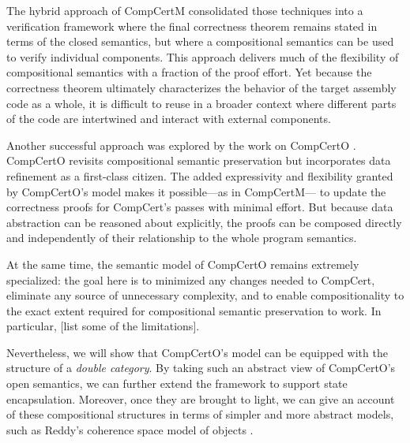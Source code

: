 \documentclass[acmsmall,screen,review,anonymous]{acmart}
\begin{document}
The hybrid approach of CompCertM
\cite{compcertm}
consolidated those techniques
into a verification framework
where the final correctness theorem
remains stated in terms of the closed semantics,
but where a compositional semantics
can be used to verify individual components.
This approach delivers much of the flexibility
of compositional semantics
with a fraction of the proof effort.
Yet because the correctness theorem
ultimately characterizes the behavior
of the target assembly code as a whole,
it is difficult to reuse
in a broader context where
different parts of the code
are intertwined and interact with
external components.

Another successful approach
was explored by the work on CompCertO \cite{compcerto}.
CompCertO revisits compositional semantic preservation
but incorporates data refinement
as a first-class citizen.
The added expressivity and flexibility
granted by CompCertO's model
makes it possible---as in CompCertM---%
to update the correctness proofs for CompCert's passes
with minimal effort.
But because data abstraction can be reasoned about explicitly,
the proofs can be composed directly and independently
of their relationship to the whole program semantics.

At the same time,
the semantic model of CompCertO
remains extremely specialized:
the goal here is to minimized any changes needed to CompCert,
eliminate any source of unnecessary complexity,
and to enable compositionality
to the exact extent required
for compositional semantic preservation
to work.
In particular,
[list some of the limitations].

Nevertheless,
we will show that CompCertO's model
can be equipped with the structure of
a \emph{double category}.
By taking such an abstract view
of CompCertO's open semantics,
we can further extend the framework
to support state encapsulation.
Moreover,
once they are brought to light,
we can give an account of
these compositional structures
in terms of simpler and more abstract models,
such as Reddy's
coherence space model of objects
\cite{objsem}.

\end{document}
